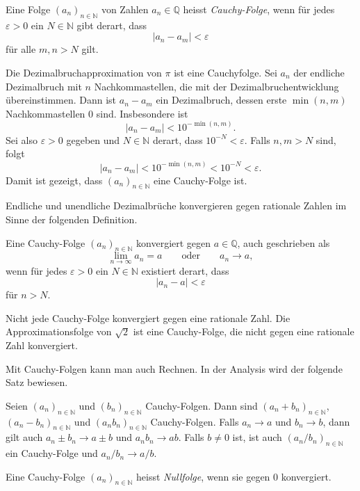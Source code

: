 \begin{definition}
Eine Folge $(a_n)_{n\in\mathbb{N}}$ von Zahlen $a_n\in\mathbb{Q}$ heisst
\emph{Cauchy-Folge}, wenn für jedes $\varepsilon>0$ ein $N\in\mathbb{N}$
%
gibt derart, dass
\[
|a_n-a_m| < \varepsilon
\]
für alle $m,n> N$ gilt.
\end{definition}

Die Dezimalbruchapproximation von $\pi$ ist eine Cauchyfolge.
Sei $a_n$ der endliche Dezimalbruch mit $n$ Nachkommastellen, die
mit der Dezimalbruchentwicklung übereinstimmen.
Dann ist
$a_n-a_m$ ein Dezimalbruch, dessen erste $\min(n,m)$ Nachkommastellen
$0$ sind.
Insbesondere ist
\[
|a_n-a_m| < 10^{-\min(n,m)}.
\]
Sei also $\varepsilon>0$ gegeben und $N\in\mathbb{N}$ derart,
dass $10^{-N}<\varepsilon$.
Falls $n,m>N$ sind, folgt
\[
|a_n-a_m|
<
10^{-\min(n,m)}
<
10^{-N}
<
\varepsilon.
\]
Damit ist gezeigt, dass $(a_n)_{n\in\mathbb{N}}$ eine Cauchy-Folge ist.

Endliche und unendliche Dezimalbrüche konvergieren gegen rationale Zahlen
im Sinne der folgenden Definition.

\begin{definition}
%
Eine Cauchy-Folge $(a_n)_{n\in\mathbb{N}}$ konvergiert gegen $a\in\mathbb{Q}$,
auch geschrieben als
\[
\lim_{n\to\infty} a_n = a
\qquad\text{oder}\qquad
a_n\to a,
\]
wenn für jedes $\varepsilon>0$ ein $N\in\mathbb{N}$ existiert derart, dass
\[
|a_n-a|<\varepsilon
\]
für $n>N$.
\end{definition}

Nicht jede Cauchy-Folge konvergiert gegen eine rationale Zahl.
Die Approximationsfolge von $\!\sqrt{2}$ ist eine Cauchy-Folge, die nicht
gegen eine rationale Zahl konvergiert.

Mit Cauchy-Folgen kann man auch Rechnen.
In der Analysis wird der folgende Satz bewiesen.

\begin{satz}
Seien $(a_n)_{n\in\mathbb{N}}$ und $(b_n)_{n\in\mathbb{N}}$ Cauchy-Folgen.
Dann sind $(a_n+b_n)_{n\in\mathbb{N}}$, $(a_n-b_n)_{n\in\mathbb{N}}$ 
und $(a_nb_n)_{n\in\mathbb{N}}$ Cauchy-Folgen.
Falls $a_n\to a$ und $b_n\to b$, dann gilt auch
$a_n\pm b_n\to a\pm b$ und $a_nb_n\to ab$.
Falls $b\ne 0$ ist, ist auch $(a_n/b_n)_{n\in\mathbb{N}}$ ein Cauchy-Folge
und $a_n/b_n \to a/b$.
\end{satz}

\begin{definition}[Nullfolge]
Eine Cauchy-Folge $(a_n)_{n\in\mathbb{N}}$ heisst \emph{Nullfolge}, wenn
sie gegen $0$ konvergiert.
%
\end{definition}

